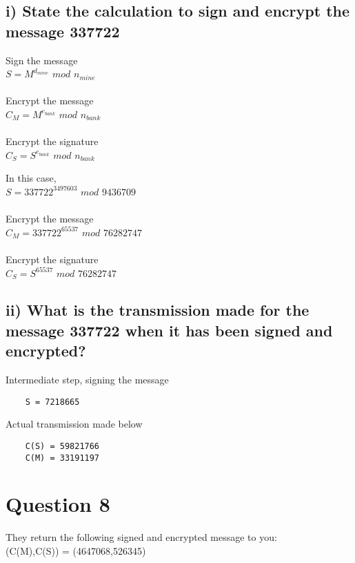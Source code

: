\documentclass[a4paper,12pt]{article}
\begin{document}
\subsection*{i) State the calculation to sign and encrypt the message 337722}
Sign the message\\
$S = M^{d_{mine}}$ $mod$ $n_{mine}$ \\ \\
Encrypt the message\\
$C_M = M^{e_{bank}}$ $mod$ $n_{bank}$\\\\
Encrypt the signature\\
$C_S = S^{e_{bank}}$ $mod$ $n_{bank}$\newpage

\noindent In this case,\\
$S = 337722^{3497603}$ $mod$ $9436709$ \\ \\
Encrypt the message\\
$C_M = 337722^{65537}$ $mod$ $76282747$\\\\
Encrypt the signature\\
$C_S = S^{65537}$ $mod$ $76282747$

\subsection*{ii) What is the transmission made for the message 337722 when it has been signed and encrypted?}
Intermediate step, signing the message
\begin{verbatim}
    S = 7218665
\end{verbatim}
Actual transmission made below
\begin{verbatim}
    C(S) = 59821766
    C(M) = 33191197
\end{verbatim}


\section*{Question 8}
They return the following signed and encrypted message to you:\\
(C(M),C(S)) = (4647068,526345)
\end{document}
